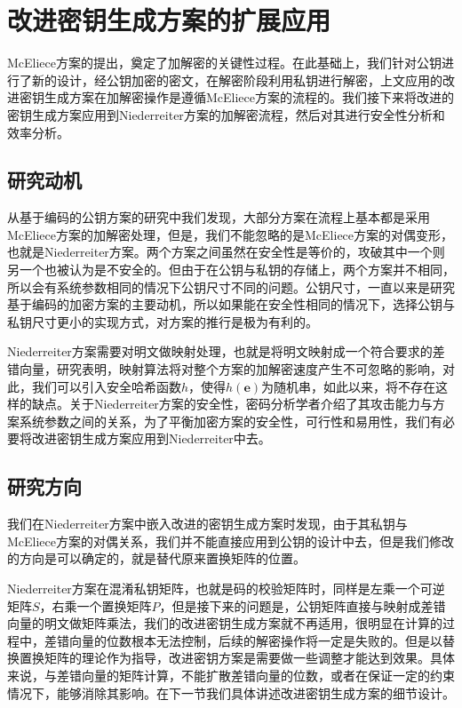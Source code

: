 \chapter{改进密钥生成方案的扩展应用}
McEliece方案的提出，奠定了加解密的关键性过程。在此基础上，我们针对公钥进行了新的设计，经公钥加密的密文，在解密阶段利用私钥进行解密，上文应用的改进密钥生成方案在加解密操作是遵循McEliece方案的流程的。我们接下来将改进的密钥生成方案应用到Niederreiter方案的加解密流程，然后对其进行安全性分析和效率分析。

\section{研究动机}
从基于编码的公钥方案的研究中我们发现，大部分方案在流程上基本都是采用McEliece方案的加解密处理，但是，我们不能忽略的是McEliece方案的对偶变形，也就是Niederreiter方案。两个方案之间虽然在安全性是等价的，攻破其中一个则另一个也被认为是不安全的。但由于在公钥与私钥的存储上，两个方案并不相同，所以会有系统参数相同的情况下公钥尺寸不同的问题。公钥尺寸，一直以来是研究基于编码的加密方案的主要动机，所以如果能在安全性相同的情况下，选择公钥与私钥尺寸更小的实现方式，对方案的推行是极为有利的。

Niederreiter方案需要对明文做映射处理，也就是将明文映射成一个符合要求的差错向量，研究表明，映射算法将对整个方案的加解密速度产生不可忽略的影响，对此，我们可以引入安全哈希函数$h$，使得$h(\mathbf{e})$为随机串，如此以来，将不存在这样的缺点。关于Niederreiter方案的安全性，密码分析学者介绍了其攻击能力与方案系统参数之间的关系，为了平衡加密方案的安全性，可行性和易用性，我们有必要将改进密钥生成方案应用到Niederreiter中去。

\section{研究方向}
我们在Niederreiter方案中嵌入改进的密钥生成方案时发现，由于其私钥与McEliece方案的对偶关系，我们并不能直接应用到公钥的设计中去，但是我们修改的方向是可以确定的，就是替代原来置换矩阵的位置。

Niederreiter方案在混淆私钥矩阵，也就是码的校验矩阵时，同样是左乘一个可逆矩阵$S$，右乘一个置换矩阵$P$，但是接下来的问题是，公钥矩阵直接与映射成差错向量的明文做矩阵乘法，我们的改进密钥生成方案就不再适用，很明显在计算的过程中，差错向量的位数根本无法控制，后续的解密操作将一定是失败的。但是以替换置换矩阵的理论作为指导，改进密钥方案是需要做一些调整才能达到效果。具体来说，与差错向量的矩阵计算，不能扩散差错向量的位数，或者在保证一定的约束情况下，能够消除其影响。在下一节我们具体讲述改进密钥生成方案的细节设计。

